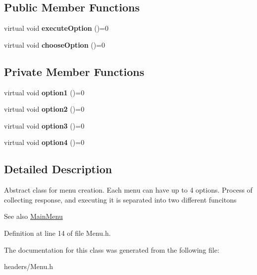 \subsection*{Public Member Functions}
\begin{DoxyCompactItemize}
\item 
\mbox{\label{classMenu_aa1725abe88c32d342bb81be3b7a58b3c}} 
virtual void {\bfseries execute\+Option} ()=0
\item 
\mbox{\label{classMenu_acfdff87e19042816325dd4f99930843a}} 
virtual void {\bfseries choose\+Option} ()=0
\end{DoxyCompactItemize}
\subsection*{Private Member Functions}
\begin{DoxyCompactItemize}
\item 
\mbox{\label{classMenu_ad78c6112dae7a98bff166136fd52365a}} 
virtual void {\bfseries option1} ()=0
\item 
\mbox{\label{classMenu_a256af8b3454cd55d2f66e8db6d051e95}} 
virtual void {\bfseries option2} ()=0
\item 
\mbox{\label{classMenu_a68e18de4624af35fe1f339dfcb2f2813}} 
virtual void {\bfseries option3} ()=0
\item 
\mbox{\label{classMenu_a33fe544a273f2851280e3334ef728dac}} 
virtual void {\bfseries option4} ()=0
\end{DoxyCompactItemize}


\subsection{Detailed Description}
Abstract class for menu creation. Each menu can have up to 4 options. Process of collecting response, and executing it is separated into two different funcitons \begin{DoxySeeAlso}{See also}
\hyperlink{classMainMenu}{Main\+Menu} 
\end{DoxySeeAlso}


Definition at line 14 of file Menu.\+h.



The documentation for this class was generated from the following file\+:\begin{DoxyCompactItemize}
\item 
headers/Menu.\+h\end{DoxyCompactItemize}
